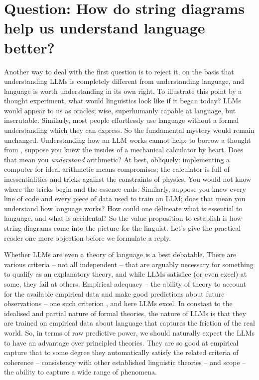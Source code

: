 \section{\textbf{Question:} How do string diagrams help us understand language better?}

Another way to deal with the first question is to reject it, on the basis that understanding LLMs is completely different from understanding language, and language is worth understanding in its own right. To illustrate this point by a thought experiment, what would linguistics look like if it began today? LLMs would appear to us as oracles; wise, superhumanly capable at language, but inscrutable. Similarly, most people effortlessly use language without a formal understanding which they can express. So the fundamental mystery would remain unchanged. Understanding how an LLM works cannot help: to borrow a thought from \citep{}, suppose you knew the insides of a mechanical calculator by heart. Does that mean you \emph{understand} arithmetic? At best, obliquely: implementing a computer for ideal arithmetic means compromises; the calculator is full of inessentialities and tricks against the constraints of physics. You would not know where the tricks begin and the essence ends. Similarly, suppose you knew every line of code and every piece of data used to train an LLM; does that mean you understand how language works? How could one delineate what is essential to language, and what is accidental? So the value proposition to establish is how string diagrams come into the picture for the linguist. Let's give the practical reader one more objection before we formulate a reply.


Whether LLMs are even a theory of language is a best debatable. There are various criteria -- not all independent -- that are arguably necessary for something to qualify as an explanatory theory, and while LLMs satisfice (or even excel) at some, they fail at others. Empirical adequacy -- the ability of theory to account for the available empirical data and make good predictions about future observations -- one such criterion \citep{}, and here LLMs excel. In constast to the idealised and partial nature of formal theories, the nature of LLMs is that they are trained on empirical data about language that captures the friction of the real world. So, in terms of raw predictive power, we should naturally expect the LLMs to have an advantage over principled theories. They are so good at empirical capture that to some degree they automatically satisfy the related criteria of coherence -- consistency with other established linguistic theories -- and scope -- the ability to capture a wide range of phenomena.\\

